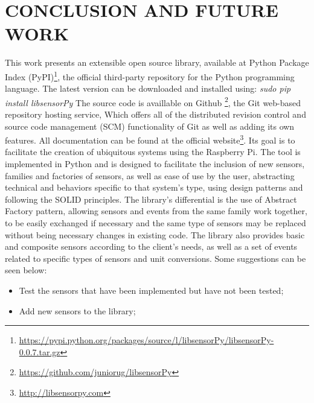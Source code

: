 \documentclass{acm_proc_article-sp}
\begin{document}
\section{CONCLUSION AND FUTURE WORK}
This work presents an extensible open source library, available at Python Package Index (PyPI)\footnote{\url{https://pypi.python.org/packages/source/l/libsensorPy/libsensorPy-0.0.7.tar.gz}}, the official third-party repository for the Python programming language. The latest version can be downloaded and installed using: 
\newline
\newline
\textit{sudo pip install libsensorPy}
\newline
\newline
The source code is availlable on Github \footnote{\url{https://github.com/juniorug/libsensorPy}}, the Git web-based repository hosting service, Which offers all of the distributed revision control and source code management (SCM) functionality of Git as well as adding its own features. All documentation can be found at the official website\footnote{\url{http://libsensorpy.com}}.
\newline
\newline
Its goal is to facilitate the creation of ubiquitous systems using the Raspberry Pi. The tool is implemented in Python and is designed to facilitate the inclusion of new sensors, families and factories of sensors, as well as ease of use by the user, abstracting technical and behaviors specific to that system's type, using design patterns and following the SOLID principles.
\newline
\newline
The library's differential is the use of Abstract Factory pattern, allowing sensors and events from the same family work together, to be easily exchanged if necessary and the same type of sensors may be replaced without being necessary changes in existing code. The library also provides basic and composite  sensors according to the client's needs, as well as a set of events related to specific types of sensors and unit conversions.
\newline
\newline
Some suggestions can be seen below:
\begin{itemize}
\item Test the sensors that have been implemented but have not been tested;
\item Add new sensors to the library;

\end{itemize}
\end{document}
